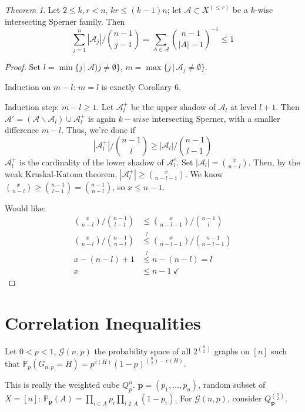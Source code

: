 \documentclass[a4paper]{article}
\theoremstyle{definition}
\theoremstyle{remark}
\theoremstyle{default}
\newtheorem{theorem}{Theorem}
\newcommand*\abs[1]{\left|#1\right|}
\begin{document}
\begin{theorem}
	Let $2 \leq k,r < n$, $kr \leq (k-1)n$;
	let $\mathcal{A} \subset X^{(\leq r)}$ be a $k$-wise intersecting Sperner family.
	Then
	$$\sum_{j=1}^n \abs{\mathcal{A}_j} \bigg/ {n-1 \choose j-1} = \sum_{A \in \mathcal{A}} {n-1 \choose \abs{A}-1}^{-1} \leq 1$$
\end{theorem}
\begin{proof}
	Set $l = \min \{j \,|\, \mathcal{A})j \neq \emptyset\}$,
	$m = \max\{j \,|\, \mathcal{A}_j \neq \emptyset\}$.
	
	Induction on $m-l$: $m=l$ is exactly Corollary 6.
	
	Induction step: $m-l \geq 1$. Let $\mathcal{A}_l^+$ be the upper shadow of $\mathcal{A}_l$ at level $l+1$.
	Then $\mathcal{A}' = (\mathcal{A} \backslash \mathcal{A}_l) \cup \mathcal{A}_l^+$ is again $k-wise$ intersecting Sperner,
	with a smaller difference $m-l$. Thus, we're done if
	$$ \abs{\mathcal{A}_l^+} \bigg/ {n-1 \choose l} \geq \abs{\mathcal{A}_l} \bigg/ {n-1 \choose l-1} $$
	$\mathcal{A}_l^+$ is the cardinality of the lower shadow of $\mathcal{A}_l^c$.
	Set $\abs{\mathcal{A}_l} = {x \choose n-l}$.
	Then, by the weak Kruskal-Katona theorem,
	$\abs{\mathcal{A}_l^+} \geq {x \choose n-l-1}$.
	We know ${x \choose n-l} \geq {n-1 \choose l-1} = {n-1 \choose n-l}$, so $x \leq n-1$.
	
	Would like:
	\begin{align*}
		{x \choose n-l} \bigg/ {n-1 \choose l-1} &\leq {x \choose n-l-1} \bigg/ {n-1 \choose l} \\
		{x \choose n-l} \bigg/ {n-1 \choose n-l} &\overset{?}{\leq} {x \choose n-l-1} \bigg/ {n-1 \choose n-l-1} \\
		x-(n-l)+1 &\overset{?}{\leq} n-(n-l) = l \\
		x &\leq n-1\ \checkmark
	\end{align*}
\end{proof}

\section{Correlation Inequalities}
\setcounter{theorem}{0}
Let $0 < p < 1$, $\mathcal{G}(n,p)$ the probability space of all $2^{{n \choose 2}}$ graphs on $[n]$ such that
$\mathbb{P}_p(G_{n,p} = H) = p^{e(H)}(1-p)^{{n \choose 2} - e(H)}$.

This is really the weighted cube $Q_p^n$. $\mathbf{p} = (p_1, \dots, p_n)$, random subset of $X=[n]$:
$\mathbb{P}_\mathbf{p}(A) = \prod_{i \in A} p_i \prod_{i \not\in A}(1-p_i)$.
For $\mathcal{G}(n,p)$, consider $Q_\mathbf{p}^{{n \choose 2}}$.
\end{document}

